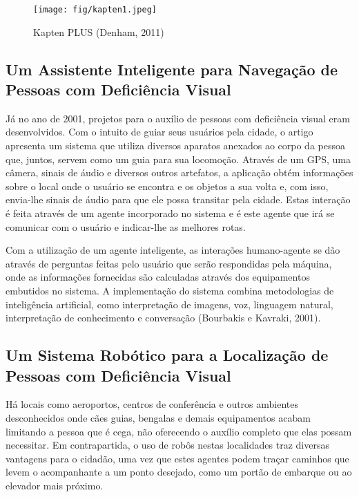 \begin{figure}[htb]
\centering
\caption[Ferramenta Kapten PLUS]{\label{fig:fig2}Kapten PLUS (Denham, 2011)}
\texttt{[image: fig/kapten1.jpeg]}
\end{figure}


\subsection{Um Assistente Inteligente para Navegação de Pessoas com Deficiência Visual}
Já no ano de 2001, projetos para o auxílio de pessoas com deficiência visual eram desenvolvidos. Com o intuito de guiar seus usuários pela cidade, o artigo apresenta um sistema que utiliza diversos aparatos anexados ao corpo da pessoa que, juntos, servem como um guia para sua locomoção. Através de um GPS, uma câmera, sinais de áudio e diversos outros artefatos, a aplicação obtém informações sobre o local onde o usuário se encontra e os objetos a sua volta e, com isso, envia-lhe sinais de áudio para que ele possa transitar pela cidade. Estas interação é feita através de um agente incorporado no sistema e é este agente que irá se comunicar com o usuário e indicar-lhe as melhores rotas.

Com a utilização de um agente inteligente, as interações humano-agente se dão através de perguntas feitas pelo usuário que serão respondidas pela máquina, onde as informações fornecidas são calculadas através dos equipamentos embutidos no sistema. A implementação do sistema combina metodologias de inteligência artificial, como interpretação de imagens, voz, linguagem natural, interpretação de conhecimento e conversação (Bourbakis e Kavraki, 2001)\nocite{BOURBAKIS2001}.

\subsection{Um Sistema Robótico para a Localização de Pessoas com Deficiência Visual}
Há locais como aeroportos, centros de conferência e outros ambientes desconhecidos onde cães guias, bengalas e demais equipamentos acabam limitando a pessoa que é cega, não oferecendo o auxílio completo que elas possam necessitar. Em contrapartida, o uso de robôs nestas localidades traz diversas vantagens para o cidadão, uma vez que estes agentes podem traçar caminhos que levem o acompanhante a um ponto desejado, como um portão de embarque ou ao elevador mais próximo.


